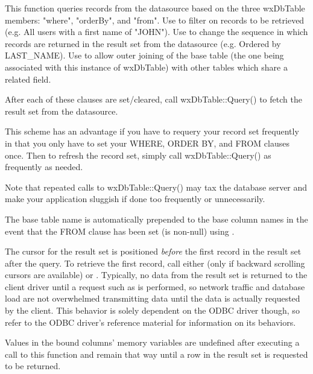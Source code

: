 
This function queries records from the datasource based on the three 
wxDbTable members: "where", "orderBy", and "from".  Use 
 to filter on 
records to be retrieved (e.g. All users with a first name of "JOHN").  
Use  to 
change the sequence in which records are returned in the result set from 
the datasource (e.g. Ordered by LAST_NAME).  Use 
 to allow outer 
joining of the base table (the one being associated with this instance of 
wxDbTable) with other tables which share a related field.  

After each of these clauses are set/cleared, call wxDbTable::Query() to 
fetch the result set from the datasource.  

This scheme has an advantage if you have to requery your record set 
frequently in that you only have to set your WHERE, ORDER BY, and FROM 
clauses once.  Then to refresh the record set, simply call wxDbTable::Query() 
as frequently as needed.  

Note that repeated calls to wxDbTable::Query() may tax the database 
server and make your application sluggish if done too frequently or 
unnecessarily.  

The base table name is automatically prepended to the base column names in 
the event that the FROM clause has been set (is non-null) using 
.

The cursor for the result set is positioned {\it before} the first record in 
the result set after the query.  To retrieve the first record, call either 
 (only if backward scrolling 
cursors are available) or 
.  Typically, no data from the 
result set is returned to the client driver until a request such as 
 is performed, so network 
traffic and database load are not overwhelmed transmitting data until the 
data is actually requested by the client.  This behavior is solely dependent 
on the ODBC driver though, so refer to the ODBC driver's reference material 
for information on its behaviors.

Values in the bound columns' memory variables are undefined after executing a 
call to this function and remain that way until a row in the result set is 
requested to be returned.

